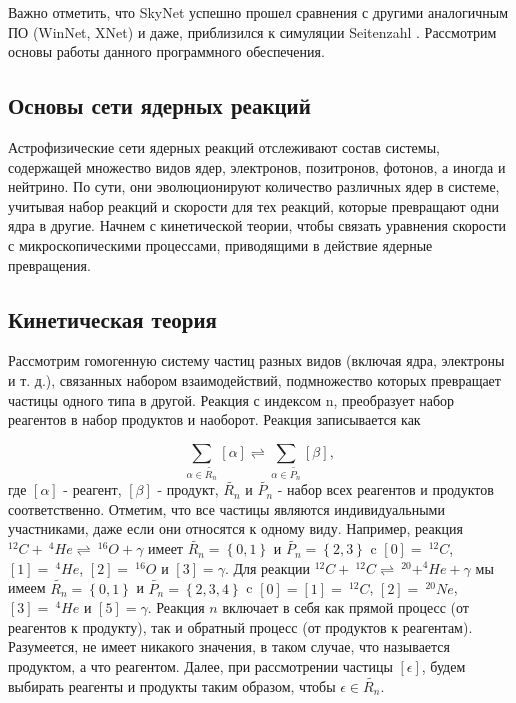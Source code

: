 \documentclass[%
master,    %
natbib,      %
subf,        %
href,        %
colorlinks,  %
]{disser}
\begin{document}
Важно отметить, что SkyNet успешно прошел сравнения с другими аналогичным ПО (WinNet, XNet) и даже, приблизился к симуляции Seitenzahl \cite{simulation}. Рассмотрим основы работы данного программного обеспечения.

\subsection{Основы сети ядерных реакций}

Астрофизические сети ядерных реакций отслеживают состав системы, содержащей множество видов ядер, электронов, позитронов, фотонов, а иногда и нейтрино. По сути, они эволюционируют количество различных ядер в системе, учитывая набор реакций и скорости для тех реакций, которые превращают одни ядра в другие. Начнем с кинетической теории, чтобы связать уравнения скорости с микроскопическими процессами, приводящими в действие ядерные превращения.

\subsection{Кинетическая теория}

Рассмотрим гомогенную систему частиц разных видов (включая ядра, электроны и т. д.), связанных набором взаимодействий, подмножество которых превращает частицы одного типа в другой. Реакция с индексом n, преобразует набор реагентов в набор продуктов и наоборот. Реакция записывается как 

$$
\sum_{\alpha \in \tilde{R_n}} [\alpha] \rightleftharpoons \sum_{\alpha \in \tilde{P_n}} [\beta],
$$
где $[\alpha]$ - реагент, $[\beta]$ - продукт, $\tilde{R_n}$ и $\tilde{P_n}$ - набор всех реагентов и продуктов соответственно. Отметим, что все частицы являются индивидуальными участниками, даже если они относятся к одному виду. Например, реакция $^{12}C + \ ^{4}He \rightleftharpoons \ ^{16}O + \gamma$ имеет $\tilde{R_n} = \left\{0, 1\right\}$ и $\tilde{P_n} = \left\{2, 3\right\}$ c $[0] = \ ^{12}C$, $[1] = \ ^4He$, $[2] = \ ^{16}O$ и $[3] = \gamma$. Для реакции $^{12}C + \ ^{12}C \rightleftharpoons \ ^{20} + ^{4}He + \gamma$ мы имеем $\tilde{R_n} = \left\{0, 1\right\}$ и $\tilde{P_n} = \left\{2, 3, 4\right\}$ c $[0] = [1] = \ ^{12}C$, $[2] = \ ^{20}Ne$, $[3] = \ ^4He$ и $[5] = \gamma$. Реакция $n$ включает в себя как прямой процесс (от реагентов к продукту), так и обратный процесс (от продуктов к реагентам). Разумеется, не имеет никакого значения, в таком случае, что называется продуктом, а что реагентом. Далее, при рассмотрении частицы $[\epsilon]$, будем выбирать реагенты и продукты таким образом, чтобы $\epsilon \in \tilde{R_n}$.
\end{document}
